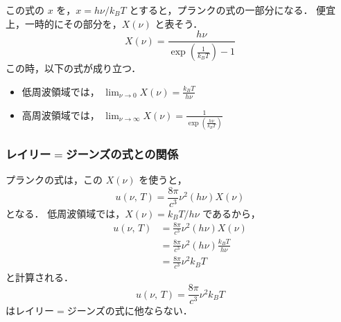             この式の $x$ を，$x=h\nu/{k}_{B}T$ とすると，プランクの式の一部分になる．
            便宜上，一時的にその部分を，$X(\nu)$ と表そう．
            \begin{equation*}
                X(\nu) = \frac{h \nu}{\exp\left( \frac{1}{{k}_{B}T} \right) - 1 }
            \end{equation*}
            この時，以下の式が成り立つ．
            \begin{itemize}
                \item 低周波領域では，
                    $\displaystyle \lim_{\nu \rightarrow 0}      X(\nu) = \frac{{k}_{B}T}{h\nu}$ \\
                \item 高周波領域では，
                    $\displaystyle \lim_{\nu \rightarrow \infty} X(\nu) = \frac{1}{\exp\left(\frac{h\nu}{{k}_{B}T}\right)}$
            \end{itemize}

            \subsubsection{レイリー$=$ジーンズの式との関係}
            プランクの式は，この $X(\nu)$ を使うと，
            \begin{equation*}
                u(\nu,\,T) = \frac{8 \pi}{{c}^{3}} {\nu}^{2} (h \nu) X(\nu)
            \end{equation*}
            となる．
            低周波領域では，$X(\nu) = {k}_{B}T/h\nu$ であるから，
            \begin{align*}
                u(\nu,\,T) &= \frac{8 \pi}{{c}^{3}} {\nu}^{2} (h \nu) X(\nu) \\
                           &= \frac{8 \pi}{{c}^{3}} {\nu}^{2} (h \nu) \frac{{k}_{B}T}{h\nu} \\
                           &= \frac{8 \pi}{{c}^{3}} {\nu}^{2} {k}_{B}T
            \end{align*}
            と計算される．
            \begin{equation*}
                u(\nu,\,T) = \frac{8 \pi}{{c}^{3}} {\nu}^{2} {k}_{B}T
            \end{equation*}
            はレイリー$=$ジーンズの式に他ならない．

